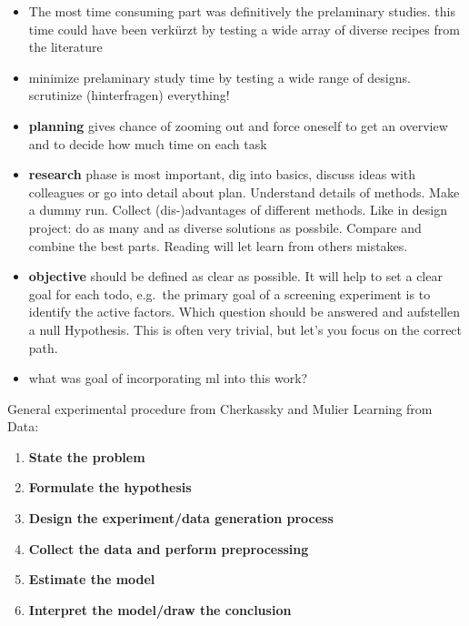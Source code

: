 \begin{itemize}
    \item The most time consuming part was definitively the prelaminary studies. this time could have been verkürzt by testing a wide array of diverse recipes from the literature
    \item minimize prelaminary study time by testing a wide range of designs. scrutinize (hinterfragen) everything!
    \item \textbf{planning} gives chance of zooming out and force oneself to get an overview and to decide how much time on each task
    \item \textbf{research} phase is most important, dig into basics, discuss ideas with colleagues or go into detail about plan. Understand details of methods. Make a dummy run. Collect (dis-)advantages of different methods. Like in design project: do as many and as diverse solutions as possbile. Compare and combine the best parts. Reading will let learn from others mistakes. \\ 
    \item \textbf{objective} should be defined as clear as possible. It will help to set a clear goal for each todo, e.g.\ the primary goal of a screening experiment is to identify the active factors\cite{miller2001using}. Which question should be answered and aufstellen a null Hypothesis. This is often very trivial, but let's you focus on the correct path. 
    \item what was goal of incorporating ml into this work? 
\end{itemize}
General experimental procedure from Cherkassky and Mulier Learning from Data\cite{cherkassky1998learning}:
\begin{enumerate}
    \item \textbf{State the problem}
    \item \textbf{Formulate the hypothesis}
    \item \textbf{Design the experiment/data generation process}
    \item \textbf{Collect the data and perform preprocessing}
    \item \textbf{Estimate the model}
    \item \textbf{Interpret the model/draw the conclusion}
\end{enumerate}
